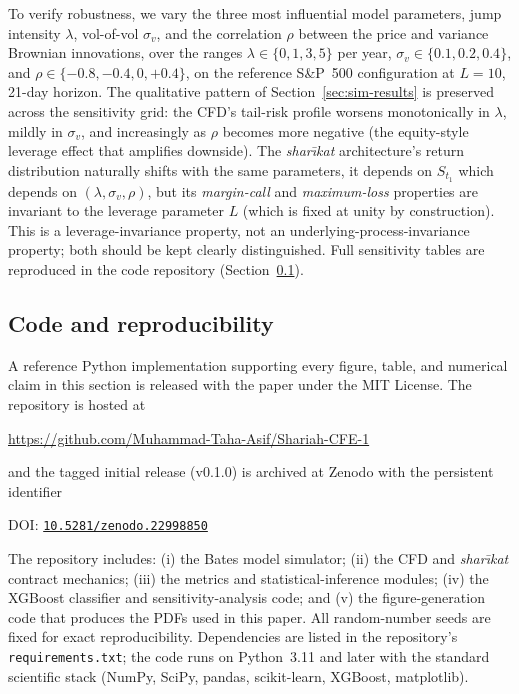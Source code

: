 \documentclass[preprint,12pt,authoryear]{elsarticle}
\theoremstyle{definition}
\begin{document}
To verify robustness, we vary the three most influential model
parameters, jump intensity $\lambda$, vol-of-vol $\sigma_v$,
and the correlation $\rho$ between the price and variance
Brownian innovations, over the ranges
$\lambda \in \{0, 1, 3, 5\}$ per year, $\sigma_v \in \{0.1, 0.2,
0.4\}$, and $\rho \in \{-0.8, -0.4, 0, +0.4\}$, on the reference
S\&P~500 configuration at $L = 10$, 21-day horizon. The
qualitative pattern of Section~\ref{sec:sim-results} is
preserved across the sensitivity grid: the CFD's tail-risk
profile worsens monotonically in $\lambda$, mildly in
$\sigma_v$, and increasingly as $\rho$ becomes more negative
(the equity-style leverage effect that amplifies downside).
The \emph{shar\={\i}kat} architecture's return distribution
naturally shifts with the same parameters, it depends on
$S_{t_1}$ which depends on $(\lambda, \sigma_v, \rho)$, but
its \emph{margin-call} and \emph{maximum-loss} properties are
invariant to the leverage parameter $L$ (which is fixed at
unity by construction). This is a leverage-invariance property,
not an underlying-process-invariance property; both should be
kept clearly distinguished. Full sensitivity tables are
reproduced in the code repository
(Section~\ref{sec:code-availability}).

\subsection{Code and reproducibility}
\label{sec:code-availability}

A reference Python implementation supporting every figure,
table, and numerical claim in this section is released with the
paper under the MIT License. The repository is hosted at
\begin{center}
\url{https://github.com/Muhammad-Taha-Asif/Shariah-CFE-1}
\end{center}
and the tagged initial release (v0.1.0) is archived at Zenodo
with the persistent identifier
\begin{center}
DOI: \href{https://doi.org/10.5281/zenodo.22998850}%
     {\texttt{10.5281/zenodo.22998850}}
\end{center}
The repository includes: (i) the Bates model simulator; (ii) the
CFD and \emph{shar\={\i}kat} contract mechanics; (iii) the
metrics and statistical-inference modules; (iv) the XGBoost
classifier and sensitivity-analysis code; and (v) the
figure-generation code that produces the PDFs used in this paper.
All random-number seeds are fixed for exact reproducibility.
Dependencies are listed in the repository's
\texttt{requirements.txt}; the code runs on Python~3.11 and later
with the standard scientific stack (NumPy, SciPy, pandas,
scikit-learn, XGBoost, matplotlib).
\end{document}
